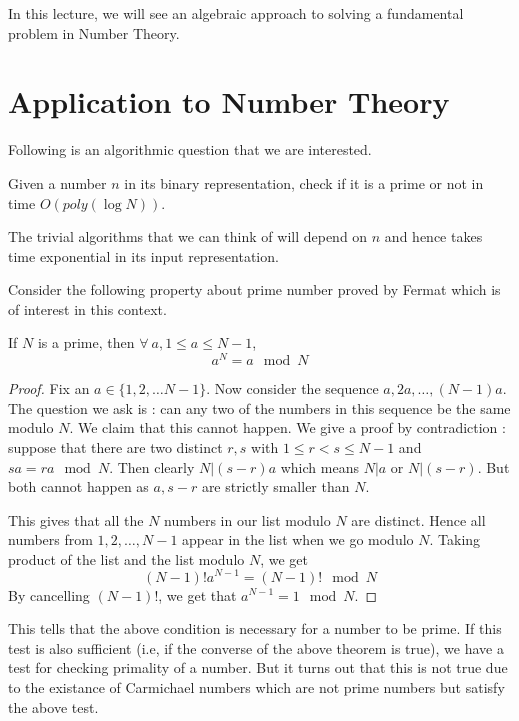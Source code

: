 In this lecture, we will see an algebraic approach to solving a fundamental
problem in Number Theory.
\section{Application to Number Theory}
Following is an algorithmic question that we are interested.
\begin{problem}
Given a number $n$ in its binary representation, check if it is a prime or not
in time $O(poly(\log N))$.
\end{problem}
\begin{note}
The trivial algorithms that we can think of will depend on $n$ and hence takes
time exponential in its input representation.
\end{note}

Consider the following property about prime number proved by Fermat which is
of interest in this context.
\begin{theorem} If $N$ is a prime, then $\forall~a, 1
	\le a \le N-1$, \[ a^N = a \mod N \]
\end{theorem}
\begin{proof}
	Fix an $a \in \{1,2,\ldots N-1\}$. Now consider the sequence $a, 2a,
	\ldots, (N-1)a$. The question we ask is : can any two of the numbers
	in this sequence be the same modulo $N$. We claim that this cannot
	happen. We give a proof by contradiction : suppose that there are two
	distinct $r,s$ with $1 \le r < s \le N-1$ and $sa = ra \mod N$. Then
	clearly $N | (s-r)a$ which means $N | a$ or $N | (s-r)$. But both
	cannot happen as $a, s-r$ are strictly smaller than $N$.

	This gives that all the $N$ numbers in our list modulo $N$ are
	distinct. Hence all numbers from $1,2,\ldots, N-1$ appear in the list
	when we go modulo $N$. Taking product of the list and the list modulo
	$N$, we get 
	\[ (N-1)! a^{N-1} = (N-1)! \mod N \]
	By cancelling $(N-1)!$, we get that $a^{N-1} = 1 \mod N$.
\end{proof}
This tells that the above condition is necessary for a number to be prime. If
this test is also sufficient (i.e, if the converse of the above theorem is
true), we have a test for checking primality of a number. But it turns out
that this is not true due to the existance of Carmichael numbers which are not
prime numbers but satisfy the above test.

